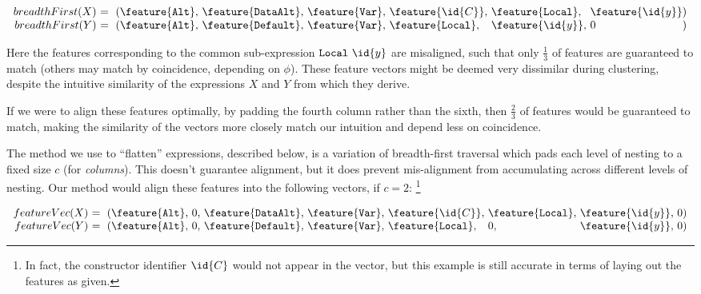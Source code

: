 \begin{small}
  \begin{equation}
    \begin{array}{r@{}l@{}l@{}l@{}l@{}l@{}l@{}l}
      breadthFirst(X)\ &=\ (\feature{\CAlt},\ &\feature{\CDataAlt},\ &\feature{\CVar},\ &\feature{\id{C}},\ &\feature{\CLocal},\ &\feature{\id{y}} &) \\
      breadthFirst(Y)\ &=\ (\feature{\CAlt},\ &\feature{\CDefault},\ &\feature{\CVar},\ &\feature{\CLocal},\ &\feature{\id{y}},\ &0 &)
    \end{array}
  \end{equation}
\end{small}

Here the features corresponding to the common sub-expression $\CLocal\ \id{y}$
are misaligned, such that only $\frac{1}{3}$ of features are guaranteed to match
(others may match by coincidence, depending on $\phi$). These feature vectors
might be deemed very dissimilar during clustering, despite the intuitive
similarity of the expressions $X$ and $Y$ from which they derive.

If we were to align these features optimally, by padding the fourth column
rather than the sixth, then $\frac{2}{3}$ of features would be guaranteed to
match, making the similarity of the vectors more closely match our intuition and
depend less on coincidence.

The method we use to ``flatten'' expressions, described below, is a variation of
breadth-first traversal which pads each level of nesting to a fixed size $c$
(for \emph{columns}). This doesn't guarantee alignment, but it does prevent
mis-alignment from accumulating across different levels of nesting. Our method
would align these features into the following vectors, if $c = 2$: \footnote{In
  fact, the constructor identifier $\id{C}$ would not appear in the vector, but
  this example is still accurate in terms of laying out the features as given.}

\begin{small}
  \begin{equation}\label{eq:flattened}
    \begin{array}{r@{}l@{}l@{}l@{}l@{}l@{}l@{}l@{}l@{}l}
      featureVec(X)\ &=\ (\feature{\CAlt},\ &0,\ &\feature{\CDataAlt},\ &\feature{\CVar},\ &\feature{\id{C}},\  &\feature{\CLocal},\ &\feature{\id{y}},\ &0 &) \\
      featureVec(Y)\ &=\ (\feature{\CAlt},\ &0,\ &\feature{\CDefault},\ &\feature{\CVar},\ &\feature{\CLocal},\ &0,\                 &\feature{\id{y}},\ &0 &)
    \end{array}
  \end{equation}
\end{small}

